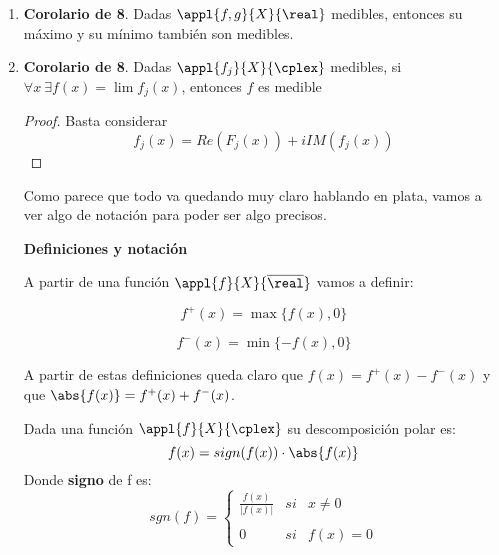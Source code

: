 \documentclass{apuntes}
\begin{document}
\begin{enumerate}
\begin{proof}
Ya sabemos que la $\salgb$ de Borel está formada por:
\[\algbB_{\overline{\real}} = \algbM(\{(a, \infty] \tq a \in \real\})\]
Para demostrar que las funciones $g_i(x)$ son medibles, tenemos que ver que la inversa de estas funciones de un elemento medible es medible. Recordemos que dado un espacio de medida son medibles aquellos conjuntos contenidos en el álgebra.
\begin{enumerate}
\item
\[x \in g^{-1}((a, \infty]) \iff g_1(x) \in (a, \infty] \iff f_j(x) \in (a, \infty] \iff \]
\[\iff \exists j \tq x \in f^{-1}_j((a, \infty])\]
Por tanto
\[g^{-1}_1((a, \infty]) = \bigcup_j f^{-1}_j((a, \infty]) \text{ medible }\]

\item $g_2(x) = - \sup\{f_j(x)\}$

\item $g_3(x) = \limsup f_j(x) = \lim_n \sup_{j \geq n}\{f_j(x)\}=\inf_n \sup_{j \geq n}\{f_j(x)\}$ es medible
\end{enumerate}
\end{proof}
\item \textbf{Corolario de 8}. Dadas $\appl{f,g}{X}{\real}$ medibles, entonces su máximo y su mínimo también son medibles.

\item \textbf{Corolario de 8}. Dadas $\appl{f_j}{X}{\cplex}$ medibles, si $\forall x \ \exists f(x)=\lim f_j(x)$, entonces $f$ es medible
\begin{proof}
Basta considerar
\[f_j(x) = Re(F_j(x))+ i IM(f_j(x))\]
\end{proof}

Como parece que todo va quedando muy claro hablando en plata, vamos a ver algo de notación para poder ser algo precisos.

\textbf{Definiciones y notación}

A partir de una función $\appl{f}{X}{\overline{\real}}$ vamos a definir:

\begin{defn}[.$f^+(x)$]
\[f^+(x)=\max \{f(x), 0\}\]
\end{defn}

\begin{defn}[.$f^-(x)$]
\[f^-(x)=\min \{-f(x), 0\}\]
\end{defn}

A partir de estas definiciones queda claro que $f(x)=f^+(x)-f^-(x)$ y que $\abs{f(x)}=f^+(x)+f^-(x)$.
\newpage
\begin{defn}
Dada una función $\appl{f}{X}{\cplex}$ su descomposición polar es:
\[f(x)=sign(f(x))\cdot\abs{f(x)}\]
Donde \textbf{signo} de f es:
\[sgn(f)=\left\{ \begin{array}{lcc}
             \frac{f(x)}{|f(x)|} &   si  & x \neq 0 \\
             \\ 0 &  si  & f(x) = 0
             \end{array}
   \right.\]
\end{defn}


\end{enumerate}
\end{document}
